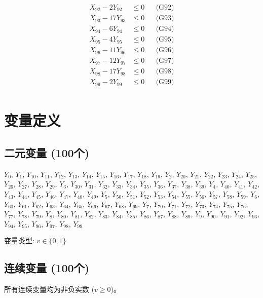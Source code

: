 \documentclass[a4paper,10pt]{article}
\begin{document}
{\begin{align}
X_{92} - 2Y_{92} &\leq 0 && \text{(G92)} \\
X_{93} - 17Y_{93} &\leq 0 && \text{(G93)} \\
X_{94} - 6Y_{94} &\leq 0 && \text{(G94)} \\
X_{95} - 4Y_{95} &\leq 0 && \text{(G95)} \\
X_{96} - 11Y_{96} &\leq 0 && \text{(G96)} \\
X_{97} - 12Y_{97} &\leq 0 && \text{(G97)} \\
X_{98} - 17Y_{98} &\leq 0 && \text{(G98)} \\
X_{99} - 2Y_{99} &\leq 0 && \text{(G99)} \\
\allowbreak
\end{align}}

\section{变量定义}

\subsection{二元变量 (100个)}

{\small $Y_{0}$, $Y_{1}$, $Y_{10}$, $Y_{11}$, $Y_{12}$, $Y_{13}$, $Y_{14}$, $Y_{15}$, $Y_{16}$, $Y_{17}$, $Y_{18}$, $Y_{19}$, $Y_{2}$, $Y_{20}$, $Y_{21}$, $Y_{22}$, $Y_{23}$, $Y_{24}$, $Y_{25}$, $Y_{26}$, $Y_{27}$, $Y_{28}$, $Y_{29}$, $Y_{3}$, $Y_{30}$, $Y_{31}$, $Y_{32}$, $Y_{33}$, $Y_{34}$, $Y_{35}$, $Y_{36}$, $Y_{37}$, $Y_{38}$, $Y_{39}$, $Y_{4}$, $Y_{40}$, $Y_{41}$, $Y_{42}$, $Y_{43}$, $Y_{44}$, $Y_{45}$, $Y_{46}$, $Y_{47}$, $Y_{48}$, $Y_{49}$, $Y_{5}$, $Y_{50}$, $Y_{51}$, $Y_{52}$, $Y_{53}$, $Y_{54}$, $Y_{55}$, $Y_{56}$, $Y_{57}$, $Y_{58}$, $Y_{59}$, $Y_{6}$, $Y_{60}$, $Y_{61}$, $Y_{62}$, $Y_{63}$, $Y_{64}$, $Y_{65}$, $Y_{66}$, $Y_{67}$, $Y_{68}$, $Y_{69}$, $Y_{7}$, $Y_{70}$, $Y_{71}$, $Y_{72}$, $Y_{73}$, $Y_{74}$, $Y_{75}$, $Y_{76}$, $Y_{77}$, $Y_{78}$, $Y_{79}$, $Y_{8}$, $Y_{80}$, $Y_{81}$, $Y_{82}$, $Y_{83}$, $Y_{84}$, $Y_{85}$, $Y_{86}$, $Y_{87}$, $Y_{88}$, $Y_{89}$, $Y_{9}$, $Y_{90}$, $Y_{91}$, $Y_{92}$, $Y_{93}$, $Y_{94}$, $Y_{95}$, $Y_{96}$, $Y_{97}$, $Y_{98}$, $Y_{99}$}

变量类型: $v \in \{0,1\}$

\subsection{连续变量 (100个)}

所有连续变量均为非负实数 ($v \geq 0$)。
\end{document}
